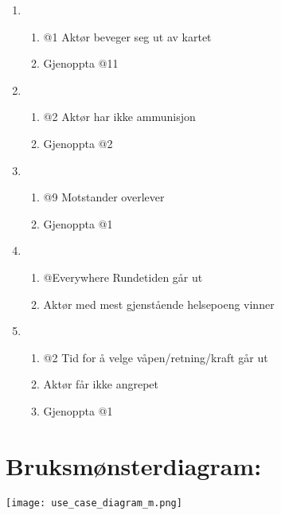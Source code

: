 \documentclass[12pt]{report}
\begin{document}
\begin{enumerate}[label=\Alph*]
\item 
\bigskip

\begin{enumerate}
\item @1 Akt{\o}r beveger seg ut av kartet 
\item Gjenoppta @11 
\end{enumerate}
\item 
\bigskip

\begin{enumerate}
\item @2 Akt{\o}r har ikke ammunisjon 
\item Gjenoppta @2 
\end{enumerate}
\item 
\bigskip

\begin{enumerate}
\item @9 Motstander overlever 
\item Gjenoppta @1 
\end{enumerate}
\item 
\bigskip

\begin{enumerate}
\item @Everywhere Rundetiden g{\aa}r ut 
\item Akt{\o}r med mest gjenst{\aa}ende helsepoeng vinner
\end{enumerate}
\item 
\bigskip

\begin{enumerate}
\item @2 Tid for {\aa} velge v{\aa}pen/retning/kraft g{\aa}r ut 
\item Akt{\o}r f{\aa}r ikke angrepet 
\item Gjenoppta @1
\end{enumerate}
\end{enumerate}

\section*{Bruksm{\o}nsterdiagram:}

\vspace{4cm}
\texttt{[image: use\_case\_diagram\_m.png]}
\end{document}
